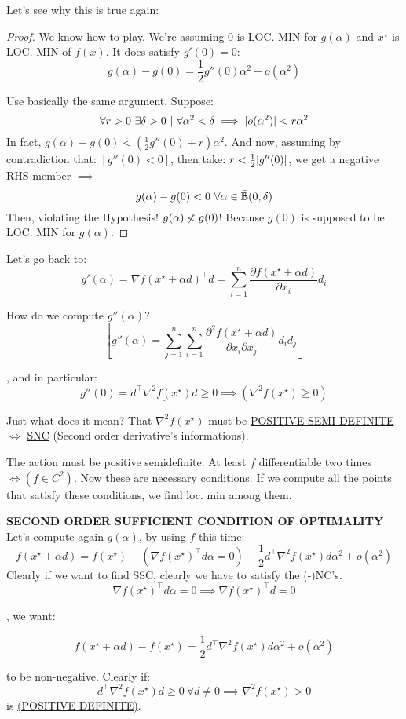 Let's see why this is true again:

\begin{proof}
We know how to play. We're assuming 0 is LOC. MIN for $g(\alpha)$ and $x^\star$ is LOC. MIN of $f(x)$. It does satisfy $g'(0)=0$:
\[
	g(\alpha) - g(0) = \frac{1}{2}g''(0)\alpha^2 + o(\alpha^2)
\]

Use basically the same argument. Suppose:
\[
	\forall r > 0\ \exists \delta > 0\ |\ \forall \alpha^2 < \delta \implies \abs{o(\alpha^2)} < r\alpha^2
\]
In fact, $g(\alpha)-g(0) < (\frac{1}{2}g''(0) + r)\alpha^2$. And now, assuming by contradiction that: $[g''(0)<0]$, then take: $r < \frac{1}{2}\lvert g''(0)\rvert$, we get a negative RHS member $\implies$
\[
	g(\alpha) - g(0) < 0\ \forall \alpha \in \bar{\mathbb{B}}(0,\delta)
\]
Then, violating the Hypothesis! $g(\alpha) \centernot{<} g(0)$! Because $g(0)$ is supposed to be LOC. MIN for $g(\alpha)$.
\end{proof}

Let's go back to:
\[
	g'(\alpha) = \nabla{f(x^\star +\alpha d)}^\top d = \sum_{i=1}^n{\frac{\partial{f(x^\star +\alpha d)}}{\partial{x_i}}d_i}
\]

How do we compute $g''(\alpha)$?
\[
	[g''(\alpha) = \sum_{j=1}^n{\sum_{i=1}^n{\frac{\partial^2{f(x^\star +\alpha d)}}{\partial{x_i}\partial{x_j}}d_id_j}}]
\]

, and in particular:
\[
	g''(0) = \underline{d^\top \nabla^2{f(x^\star)}d} \geq 0 \implies (\nabla^2{f(x^\star)} \geq 0)
\]

Just what does it mean? That $\nabla^2{f(x^\star)}$ must be \underline{POSITIVE SEMI-DEFINITE} $\iff$ \underline{SNC} (Second order derivative's informations).

The action must be positive semidefinite. At least $f$ differentiable two times $\iff (f \in C^2)$. Now these are necessary conditions. If we compute all the points that satisfy these conditions, we find loc. min among them.

\begin{thrm}{\textbf{SECOND ORDER SUFFICIENT CONDITION OF OPTIMALITY}} \newline
Let's compute again $g(\alpha)$, by using $f$ this time:
\[
	f(x^\star +\alpha d) = f(x^\star) + (\nabla{f(x^\star)}^\top d\alpha = 0) + \frac{1}{2}d^\top \nabla^2{f(x^\star)}d\alpha^2 + o(\alpha^2)
\]
Clearly if we want to find SSC, clearly we have to satisfy the (-)NC's.
\[
	\nabla{f(x^\star)}^\top d\alpha = 0 \implies \nabla{f(x^\star)}^\top d = 0
\]

, we want:

\[
	f(x^\star +\alpha d)-f(x^\star) = \frac{1}{2}d^\top \nabla^2{f(x^\star)}d\alpha^2 + o(\alpha^2)
\]

to be non-negative. Clearly if:
\[
	d^\top \nabla^2{f(x^\star)}d \geq 0\ \forall d\neq 0 \implies \nabla^2{f(x^\star)} > 0
\]
is \underline{(POSITIVE DEFINITE)}.
\end{thrm}

